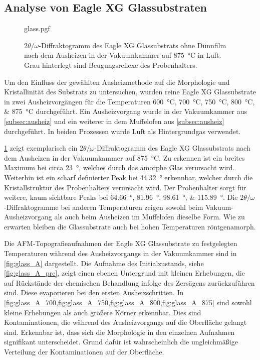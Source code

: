 



\newcommand{\temperaturesS}{pre,600,700,750,800,875}
\newcommand{\temperaturesV}{pre,500,600,700,750, 800, 875}
\newcommand{\temperaturesVthree}{pre,500,600,700}
\newcommand{\temperatureVfour}{pre, 500, 600, 700, 750, 800}
\newcommand{\temperaturesL}{pre,600, 700, 750, 800, 875}
\newcommand{\temperaturesGlas}{pre, 700, 750, 800, 875}

\subsection{Analyse von Eagle XG Glassubstraten}\label{subsec:glas}
\begin{figure}
    \centering
    {glass.pgf}
    \caption{$2\theta/\omega$-Diffraktogramm des Eagle XG Glassubstrats ohne Dünnfilm
    nach dem Ausheizen in der Vakuumkammer auf \qty{875}{\degreeCelsius} in Luft. Grau
    hinterlegt sind Beugungsreflexe des Probenhalters.}
    \label{fig:glass_XRD}
\end{figure}
Um den Einfluss der gewählten Ausheizmethode auf die Morphologie und Kristallinität des Substrats
zu untersuchen, wurden reine Eagle XG Glassubstrate in zwei Ausheizvorgängen für die Temperaturen
\qtylist{600; 700; 750; 800; 875}{\degreeCelsius} durchgeführt.
Ein Aus\-heiz\-vor\-gang wurde in der Vakuumkammer aus \cref{subsec:ausheiz} und ein weiterer
in dem Muffelofen aus \cref{subsec:ausheiz} durchgeführt.
In beiden Prozessen wurde Luft als Hintergrundgas verwendet.

\cref{fig:glass_XRD} zeigt exemplarisch ein $2\theta/\omega$-Diffraktogramm des Eagle XG Glassubstrats nach
dem Ausheizen in der Vakuumkammer auf \qty{875}{\degreeCelsius}.
Zu erkennen ist ein breites Maximum bei circa \qty{23}{\degree}, welches durch das amorphe Glas verursacht wird.
Weiterhin ist ein scharf definierter Peak bei \qty{44.32}{\degree} erkennbar, welcher durch die Kristallstruktur
des Probenhalters verursacht wird.
Der Probenhalter sorgt für weitere, kaum sichtbare Peaks bei \qtylist{64.66; 81.96; 98.61; 115.89}{\degree}.
Die $2\theta/\omega$-Diffraktogramme bei anderen Temperaturen zeigen sowohl beim Vakuum-Aus\-heiz\-vor\-gang als auch
beim Ausheizen im Muffelofen dieselbe Form.
Wie zu erwarten bleiben die Glassubstrate auch bei hohen Temperaturen röntgenamorph.

Die AFM-Topografieaufnahmen der Eagle XG Glassubstrate zu festgelegten Temperaturen während des Aus\-heiz\-vor\-gangs
in der Vakuumkammer sind in \cref{fig:glass_A} dargestellt.
Die Aufnahme des Initialzustands, siehe \cref{fig:glass_A_pre}, zeigt einen ebenen Untergrund mit kleinen Erhebungen,
die auf Rückstände der chemischen Behandlung infolge des Zersägens zurückzuführen sind.
Diese evaporieren bei den ersten Ausheizschritten.
In \cref{fig:glass_A_700,fig:glass_A_750,fig:glass_A_800,fig:glass_A_875} sind sowohl kleine Erhebungen als auch
größere Körner erkennbar.
Dies sind Kontaminationen, die während des Aus\-heiz\-vor\-gangs auf die Oberfläche gelangt sind.
Erkennbar ist, dass sich die Morphologie in den einzelnen Aufnahmen signifikant unterscheidet.
Grund dafür ist wahrscheinlich die ungleichmäßige Verteilung der Kontaminationen auf der Oberfläche.

